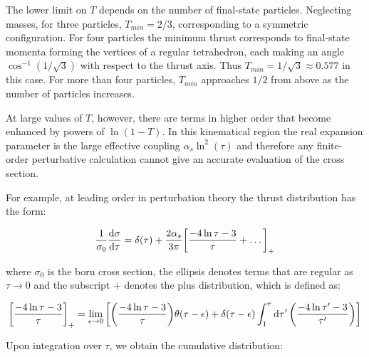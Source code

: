 \documentclass[../main.tex]{subfiles}
\begin{document}
The lower limit on $T$ depends on the number of final-state particles.
Neglecting masses, for three particles, $T_{min} = 2/3$, corresponding to a symmetric configuration.
For four particles the minimum thrust corresponds to final-state momenta forming the vertices of a regular tetrahedron,
each making an angle $\cos^{-1}(1/\sqrt{3})$ with respect to the thrust axis. Thus $T_{min} = 1/\sqrt{3} \approx 0.577$ in this
case. For more than four particles, $T_{min}$ approaches $1/2$ from above as the number of particles increases.

At large values of $T$, however, there are terms in higher order that become enhanced by powers of $\ln(1 - T)$.
In this kinematical region the real expansion parameter is the large effective coupling $\alpha_s \ln^2(\tau)$ and therefore
any finite-order perturbative calculation cannot give an accurate evaluation of the cross section.

For example, at leading order in perturbation theory the thrust distribution has the form:

\begin{equation}\label{eq:LO fixed order}
    \frac{1}{\sigma_0}\dv{\sigma}{\tau} = \delta(\tau) + \frac{2\alpha_s}{3\pi} \qty[\frac{-4 \ln \tau - 3}{\tau} + \dots]_{+}
\end{equation}

where $\sigma_0$ is the born cross section, the ellipsis denotes terms that are regular as $\tau \to 0$ and the subscript $+$ denotes the 
plus distribution, which is defined as:

\begin{equation}
    \qty[\frac{-4 \ln \tau - 3}{\tau}]_{+} = \lim_{\epsilon \to 0}\qty[ \qty(\frac{-4 \ln \tau - 3}{\tau}) \theta(\tau - \epsilon) +\delta(\tau - \epsilon)\int_1^{\tau}  \dd{\tau'} \qty(\frac{-4 \ln \tau' - 3}{\tau'})]
\end{equation}

Upon integration over $\tau$, we obtain the cumulative distribution:

\end{document}

